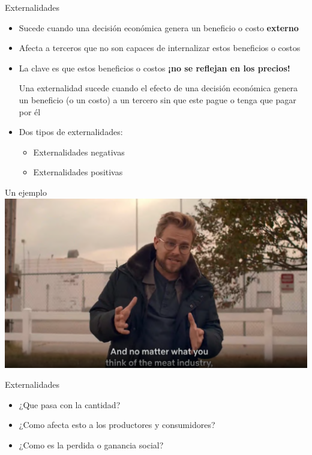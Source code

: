 \documentclass{beamer}
\begin{document}
\begin{frame}{Externalidades}
    \begin{itemize}
        \item Sucede cuando una decisión económica genera un beneficio o costo \textbf{externo}
        \item Afecta a terceros que no son capaces de internalizar estos beneficios o costos
        \item La clave es que estos beneficios o costos \textbf{¡no se reflejan en los precios!}
        \begin{boxA}
            \centering
            Una externalidad sucede cuando el efecto de una decisión económica genera un beneficio (o un costo) a un tercero sin que este pague o tenga que pagar por él
        \end{boxA}
        \item Dos tipos de externalidades: 
        \begin{itemize}
            \item Externalidades negativas
            \item Externalidades positivas
        \end{itemize}
    \end{itemize}
\end{frame}

\begin{frame}{Un ejemplo}
    \centering
    \href{https://econ.video/2022/06/20/the-g-word-with-adam-conover-externalities-regulation/}{\includegraphics[scale=0.35]{../Figures/ExternalidadP.png}}  
\end{frame}

\begin{frame}{Externalidades}
    \begin{itemize}
        \item ¿Que pasa con la cantidad?
        \item ¿Como afecta esto a los productores y consumidores?
        \item ¿Como es la perdida o ganancia social?
    \end{itemize}
\end{frame}
\end{document}
